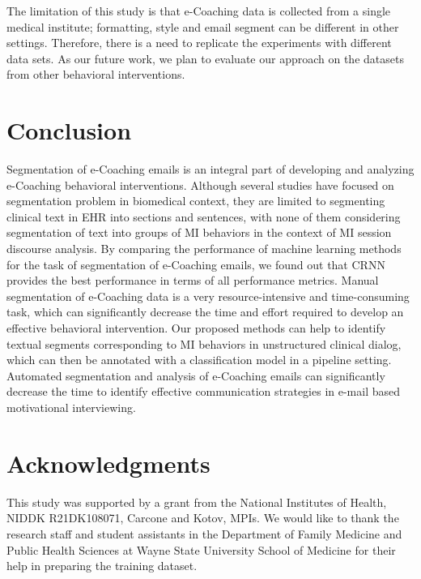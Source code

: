 \documentclass{amia}
\begin{document}
The limitation of this study is that e-Coaching data is collected from a single medical institute; formatting, style and email segment can be different in other settings. Therefore, there is a need to replicate the experiments with different data sets. As our future work, we plan to evaluate our approach on the datasets from other behavioral interventions. 
 
\section*{Conclusion}


Segmentation of e-Coaching emails is an integral part of developing and analyzing e-Coaching behavioral interventions. Although several studies have focused on segmentation problem in biomedical context, they are limited to segmenting clinical text in EHR into sections and sentences, with none of them considering segmentation of text into groups of MI behaviors in the context of MI session discourse analysis. By comparing the performance of machine learning methods for the task of segmentation of e-Coaching emails, we found out that CRNN provides the best performance in terms of all performance metrics. Manual segmentation of e-Coaching data is a very resource-intensive and time-consuming task, which can significantly decrease the time and effort required to develop an effective behavioral intervention. Our proposed methods can help to identify textual segments corresponding to MI behaviors in unstructured clinical dialog, which can then be annotated with a classification model in a pipeline setting. Automated segmentation and analysis of e-Coaching emails can significantly decrease the time to identify effective communication strategies in e-mail based motivational interviewing.

\section*{Acknowledgments}
This study was supported by a grant from the National Institutes of Health, NIDDK R21DK108071, Carcone and Kotov, MPIs. We would like to thank the research staff and student assistants in the Department of Family Medicine and Public Health Sciences at Wayne State University School of Medicine for their help in preparing the training dataset. 



\end{document}
